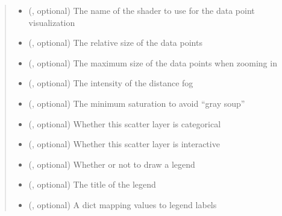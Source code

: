 \documentclass[letterpaper,10pt,english]{sphinxmanual}
\begin{document}
\begin{fulllineitems}
\begin{fulllineitems}
\begin{quote}
\begin{description}
\begin{itemize}
\item {} 
 (, optional) \textendash{} The name of the shader to use for the data point visualization

\item {} 
 (, optional) \textendash{} The relative size of the data points

\item {} 
 (, optional) \textendash{} \textendash{} The maximum size of the data points when zooming in

\item {} 
 (, optional) \textendash{} \textendash{} The intensity of the distance fog

\item {} 
 (, optional) \textendash{} \textendash{} The minimum saturation to avoid “gray soup”

\item {} 
 (, optional) \textendash{} \textendash{} Whether this scatter layer is categorical

\item {} 
 (, optional) \textendash{} \textendash{} Whether this scatter layer is interactive

\item {} 
 (, optional) \textendash{} \textendash{} Whether or not to draw a legend

\item {} 
 (, optional) \textendash{} \textendash{} The title of the legend

\item {} 
 (, optional) \textendash{} \textendash{} A dict mapping values to legend labels

\end{itemize}


\end{description}
\end{quote}
\end{fulllineitems}
\end{fulllineitems}
\end{document}
